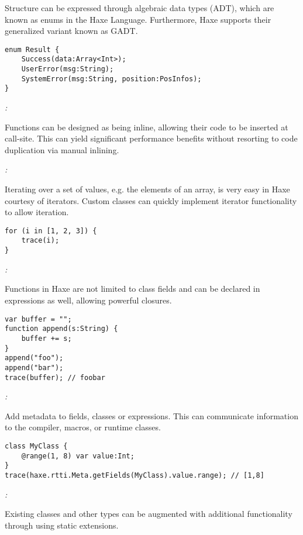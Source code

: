 Structure can be expressed through algebraic data types (ADT), which are known as enums in the Haxe Language. Furthermore, Haxe supports their generalized variant known as GADT.

\begin{lstlisting}
enum Result {
    Success(data:Array<Int>);
    UserError(msg:String);
    SystemError(msg:String, position:PosInfos);
}
\end{lstlisting}

\emph{:}

Functions can be designed as being inline, allowing their code to be inserted at call-site. This can yield significant performance benefits without resorting to code duplication via manual inlining.

\emph{:}

Iterating over a set of values, e.g. the elements of an array, is very easy in Haxe courtesy of iterators. Custom classes can quickly implement iterator functionality to allow iteration.

\begin{lstlisting}
for (i in [1, 2, 3]) {
    trace(i);
}
\end{lstlisting}

\emph{:}

Functions in Haxe are not limited to class fields and can be declared in expressions as well, allowing powerful closures.

\begin{lstlisting}
var buffer = "";
function append(s:String) {
    buffer += s;
}
append("foo");
append("bar");
trace(buffer); // foobar
\end{lstlisting}

\emph{:}

Add metadata to fields, classes or expressions. This can communicate information to the compiler, macros, or runtime classes.

\begin{lstlisting}
class MyClass {
    @range(1, 8) var value:Int;
}
trace(haxe.rtti.Meta.getFields(MyClass).value.range); // [1,8]
\end{lstlisting}

\emph{:}

Existing classes and other types can be augmented with additional functionality through using static extensions.

